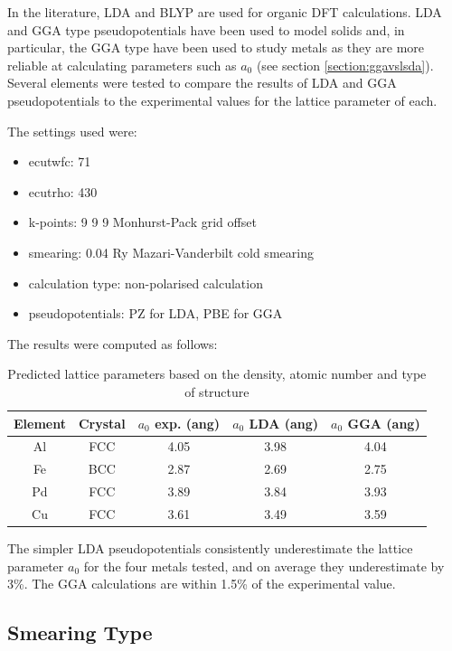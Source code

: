 In the literature, LDA and BLYP are used for organic DFT calculations.  LDA and GGA type pseudopotentials have been used to model solids and, in particular, the GGA type have been used to study metals as they are more reliable at calculating parameters such as $a_0$ (see section \ref{section:ggavslsda}).  Several elements were tested to compare the results of LDA and GGA pseudopotentials to the experimental values for the lattice parameter of each.

The settings used were:

\begin{itemize}
\item ecutwfc: 71 
\item ecutrho: 430 
\item k-points: 9 9 9 Monhurst-Pack grid offset
\item smearing: 0.04 Ry Mazari-Vanderbilt cold smearing
\item calculation type: non-polarised calculation
\item pseudopotentials: PZ for LDA, PBE for GGA
\end{itemize}

The results were computed as follows:

\begin{table}[h]
\begin{center}
\begin{tabular}{c c c c c}
\hline\hline
Element & Crystal & $a_0$ exp. (ang) & $a_0$ LDA (ang) & $a_0$ GGA (ang) \\
\hline\hline
Al     & FCC  &  4.05  &  3.98  &  4.04   \\ 
Fe     & BCC  &  2.87  &  2.69  &  2.75   \\ 
Pd     & FCC  &  3.89  &  3.84  &  3.93   \\ 
Cu     & FCC  &  3.61  &  3.49  &  3.59   \\ 
\hline\hline
\end{tabular}
\end{center}
\caption{Predicted lattice parameters based on the density, atomic number and type of structure}
\label{table:computedlattice}
\end{table}

The simpler LDA pseudopotentials consistently underestimate the lattice parameter $a_0$ for the four metals tested, and on average they underestimate by 3\%.  The GGA calculations are within 1.5\% of the experimental value.


\subsection{Smearing Type}

